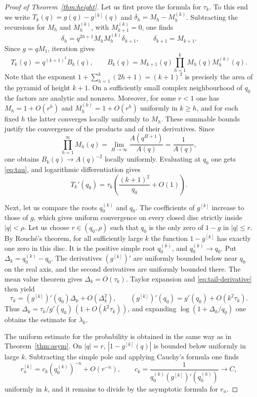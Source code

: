 \documentclass[11pt,reqno]{amsart}
\numberwithin{equation}{section}
\theoremstyle{remark}
\begin{document}
\begin{proof}[Proof of Theorem~\ref{thm:height}]
Let us first prove the formula for $\tau_k$. To this end we write
$T_k(q)=g(q)-g^{[k]}(q)$ and $\delta_h=M_h-M^{(k)}_h$. Subtracting the recursions for
$M_h$ and $M^{(k)}_h$, with $M^{(k)}_{k+1}=0$, one finds
\[
\delta_h=q^{2h+1}M_hM^{(k)}_h\delta_{h+1},\qquad
\delta_{k+1}=M_{k+1}.
\]
Since $g=qM_1$, iteration gives
\[
T_k(q)=q^{(k+1)^2}B_k(q),\qquad
B_k(q)=M_{k+1}(q)\prod_{h=1}^{k}M_h(q)M^{(k)}_h(q).
\]
Note that the exponent $1+\sum_{h=1}^k(2h+1)=(k+1)^2$ is precisely the area of the
pyramid of height $k+1$. On a sufficiently small complex neighbourhood of $q_0$ the
factors are analytic and nonzero. Moreover, for some $r<1$ one has $M_h=1+O(r^h)$ and
$M^{(k)}_h=1+O(r^h)$ uniformly in $k\ge h$, and for each fixed $h$ the latter converges
locally uniformly to $M_h$. These summable bounds justify the convergence of the products
and of their derivatives. Since
\[
\prod_{h=1}^{\infty}M_h(q)
=\lim_{H\to\infty}\frac{A(q^{H+1})}{A(q)}=\frac1{A(q)},
\]
one obtains $B_k(q)\to A(q)^{-2}$ locally uniformly. Evaluating at $q_0$ one gets
\eqref{eq:tau}, and logarithmic differentiation gives
\begin{equation}\label{eq:tail-derivative}
T_k'(q_0)=\tau_k\left(\frac{(k+1)^2}{q_0}+O(1)\right).
\end{equation}

Next, let us compare the roots $q^{(k)}_0$ and $q_0$. The coefficients of $g^{[k]}$
increase to those of $g$, which gives uniform convergence on every closed disc strictly
inside $|q|<\rho$. Let us choose $r\in(q_0,\rho)$ such that $q_0$ is the only zero of
$1-g$ in $|q|\le r$. By Rouch\'e's theorem, for all sufficiently large $k$ the function
$1-g^{[k]}$ has exactly one zero in this disc. It is the positive simple root
$q^{(k)}_0$, and $q^{(k)}_0\to q_0$. Put $\Delta_k=q^{(k)}_0-q_0$. The derivatives
$(g^{[k]})'$ are uniformly bounded below near $q_0$ on the real axis, and the second
derivatives are uniformly bounded there. The mean value theorem gives
$\Delta_k=O(\tau_k)$. Taylor expansion and \eqref{eq:tail-derivative} then yield
\[
\tau_k=(g^{[k]})'(q_0)\Delta_k+O(\Delta_k^2),\qquad
(g^{[k]})'(q_0)=g'(q_0)+O(k^2\tau_k).
\]
Thus $\Delta_k=\tau_k/g'(q_0)\,(1+O(k^2\tau_k))$, and expanding $\log(1+\Delta_k/q_0)$
one obtains the estimate for $\lambda_k$.

The uniform estimate for the probability is obtained in the same way as in
Theorem~\ref{thm:asym}. On $|q|=r$, $|1-g^{[k]}(q)|$ is bounded below uniformly in large
$k$. Subtracting the simple pole and applying Cauchy's formula one finds
\[
r_n^{[k]}=c_k(q^{(k)}_0)^{-n}+O(r^{-n}),\qquad
c_k=\frac1{q^{(k)}_0(g^{[k]})'(q^{(k)}_0)}\longrightarrow C,
\]
uniformly in $k$, and it remains to divide by the asymptotic formula for $r_n$.


\end{proof}
\end{document}
